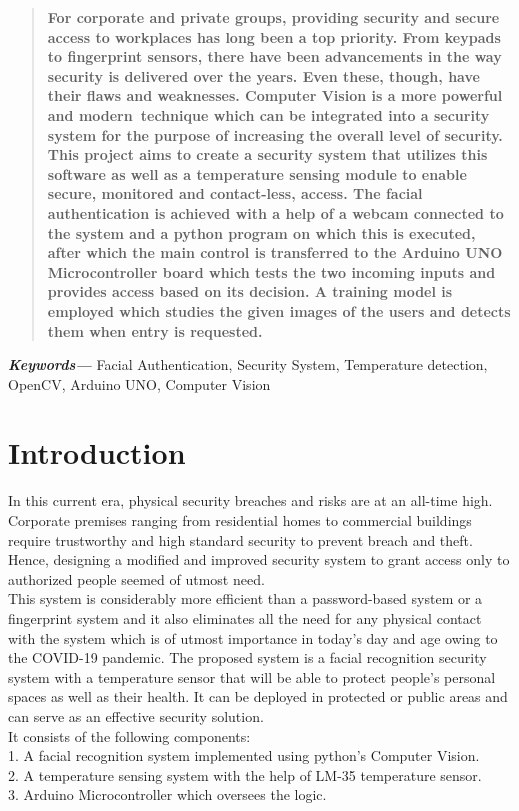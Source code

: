 \documentclass[conference]{IEEEtran}
\providecommand{\keywords}[1]
{

	\textbf{\textit{Keywords---}} #1
}
\begin{document}
	\begin{abstract}
		\textbf{For corporate and private groups, providing security and secure access to workplaces has long been a top priority. From keypads to fingerprint sensors, there have been advancements in the way security is delivered over the years. Even these, though, have their flaws and weaknesses. Computer Vision is a more powerful and modern technique which can be integrated into a security system for the purpose of increasing the overall level of security. This project aims to create a security system that utilizes this software as well as a temperature sensing module to enable secure, monitored and contact-less, access. The facial authentication is achieved with a help of a webcam connected to the system and a python program on which this is executed,
			after which the main control is transferred to the Arduino
			UNO Microcontroller board which tests the two incoming
			inputs and provides access based on its decision. A training model is employed which studies the given
			images of the users and detects them when entry is requested.\\}
	\end{abstract}
	
	\keywords{
		Facial Authentication, Security System, Temperature
		detection, OpenCV, Arduino UNO, Computer Vision
}
	
	
	
	
	\section{Introduction}
	In this current era, physical security breaches and risks are at an all-time high. Corporate premises ranging from residential homes to commercial
	buildings require trustworthy and high standard security
	to prevent breach and theft. Hence, designing a modified and improved security system to grant
	access only to authorized people seemed of utmost need. \\This system is considerably more
	efficient than a password-based system or a fingerprint
	system and it also eliminates all the need for any physical contact with the system which is of utmost importance in today's day and age owing to the COVID-19 pandemic. 
	The proposed system is a facial recognition security system with a temperature sensor that will be able to protect people’s
	personal spaces as well as their health. It can be deployed in protected or public areas and can serve as an effective security solution.\\ It consists of the
	following components: \\
	1. A facial recognition system implemented using python's Computer Vision. \\
	2. A temperature sensing system with the help of LM-35 temperature sensor. \\
	3. Arduino Microcontroller which oversees the logic\cite{a}.
	
\end{document}
